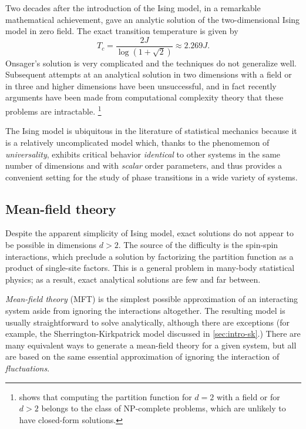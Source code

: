 Two decades after the introduction of the Ising model, in a remarkable
mathematical achievement, \textcite{onsager1944crystal} gave an analytic
solution of the two-dimensional Ising model in zero field. The exact
transition temperature is given by%
\begin{equation}
  T_c = \frac{2J}{\log(1 + \sqrt{2})} \approx 2.269 J.
  \label{eq:ising-Tc-exact}
\end{equation}
Onsager's solution is very complicated and the techniques do not generalize
well. Subsequent attempts at an analytical solution in two dimensions with a
field or in three and higher dimensions have been unsuccessful, and in fact
recently arguments have been made from computational complexity theory that
these problems are intractable.%
\footnote{%
  \textcite{istrail2000statistical} shows that computing the partition function
  for $d=2$ with a field or for $d>2$ belongs to the class of NP-complete
  problems, which are unlikely to have closed-form solutions.
}

The Ising model is ubiquitous in the literature of statistical mechanics
because it is a relatively uncomplicated model which, thanks to the phenomemon
of \emph{universality}, exhibits critical behavior \emph{identical} to other
systems in the same number of dimensions and with \emph{scalar} order
parameters, and thus provides a convenient setting for the study of phase
transitions in a wide variety of systems.


\subsection{Mean-field theory}

Despite the apparent simplicity of Ising model, exact solutions do not appear
to be possible in dimensions $d>2$. The source of the difficulty is the
spin-spin interactions, which preclude a solution by factorizing the partition
function as a product of single-site factors. This is a general problem in
many-body statistical physics; as a result, exact analytical solutions are few
and far between.

\emph{Mean-field theory} (MFT) is the simplest possible approximation of an
interacting system aside from ignoring the interactions altogether. The
resulting model is usually straightforward to solve analytically, although
there are exceptions (for example, the Sherrington-Kirkpatrick model discussed
in \cref{sec:intro-sk}.) There are many equivalent ways to generate a
mean-field theory for a given system, but all are based on the same essential
approximation of ignoring the interaction of \emph{fluctuations}.

